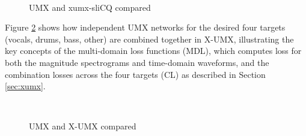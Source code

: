 \documentclass[report.tex]{subfiles}
\begin{document}
\begin{figure}[ht]
	\centering
	\\
	\caption{UMX and xumx-sliCQ compared}
	\label{fig:umxandxumxslicq}
\end{figure}

Figure \ref{fig:xumxcl} shows how independent UMX networks for the desired four targets (vocals, drums, bass, other) are combined together in X-UMX, illustrating the key concepts of the multi-domain loss functions (MDL), which computes loss for both the magnitude spectrograms and time-domain waveforms, and the combination losses across the four targets (CL) as described in Section \ref{sec:xumx}.

\begin{figure}[ht]
	\centering
	\\
	\caption{UMX and X-UMX compared}
	\label{fig:xumxcl}
\end{figure}
\end{document}
